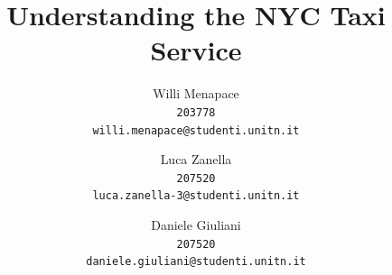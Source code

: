 \documentclass{acm_proc_article-sp-sigmod09}
\begin{document}
%

\title{Understanding the NYC Taxi Service}


\author{
	Willi Menapace\\
	\texttt{203778}\\
	\texttt{willi.menapace@studenti.unitn.it}
	\and
	Luca Zanella\\
	\texttt{207520}\\
	\texttt{luca.zanella-3@studenti.unitn.it}
	\and
	Daniele Giuliani\\
	\texttt{207520}\\
	\texttt{daniele.giuliani@studenti.unitn.it}
}

%
%
\end{document}
